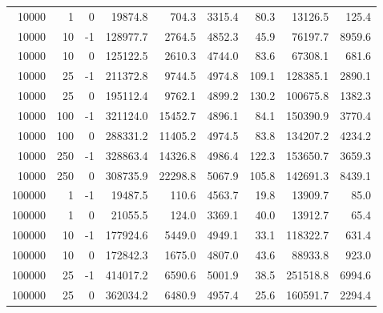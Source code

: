 \begin{longtable}{rrrrrrrrr}
   10000 &          1 &        0 &             19874.8 &     704.3 &                 3315.4 &   80.3 &            13126.5 &    125.4 \\
   10000 &         10 &       -1 &            128977.7 &    2764.5 &                 4852.3 &   45.9 &            76197.7 &   8959.6 \\
   10000 &         10 &        0 &            125122.5 &    2610.3 &                 4744.0 &   83.6 &            67308.1 &    681.6 \\
   10000 &         25 &       -1 &            211372.8 &    9744.5 &                 4974.8 &  109.1 &           128385.1 &   2890.1 \\
   10000 &         25 &        0 &            195112.4 &    9762.1 &                 4899.2 &  130.2 &           100675.8 &   1382.3 \\
   10000 &        100 &       -1 &            321124.0 &   15452.7 &                 4896.1 &   84.1 &           150390.9 &   3770.4 \\
   10000 &        100 &        0 &            288331.2 &   11405.2 &                 4974.5 &   83.8 &           134207.2 &   4234.2 \\
   10000 &        250 &       -1 &            328863.4 &   14326.8 &                 4986.4 &  122.3 &           153650.7 &   3659.3 \\
   10000 &        250 &        0 &            308735.9 &   22298.8 &                 5067.9 &  105.8 &           142691.3 &   8439.1 \\
  100000 &          1 &       -1 &             19487.5 &     110.6 &                 4563.7 &   19.8 &            13909.7 &     85.0 \\
  100000 &          1 &        0 &             21055.5 &     124.0 &                 3369.1 &   40.0 &            13912.7 &     65.4 \\
  100000 &         10 &       -1 &            177924.6 &    5449.0 &                 4949.1 &   33.1 &           118322.7 &    631.4 \\
  100000 &         10 &        0 &            172842.3 &    1675.0 &                 4807.0 &   43.6 &            88933.8 &    923.0 \\
  100000 &         25 &       -1 &            414017.2 &    6590.6 &                 5001.9 &   38.5 &           251518.8 &   6994.6 \\
  100000 &         25 &        0 &            362034.2 &    6480.9 &                 4957.4 &   25.6 &           160591.7 &   2294.4 \\

\end{longtable}
